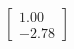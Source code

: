 \documentclass[preview]{standalone}
\begin{document}
\begin{align*}
\begin{bmatrix} 1.00 \\ -2.78 \end{bmatrix}
\end{align*}
\end{document}

